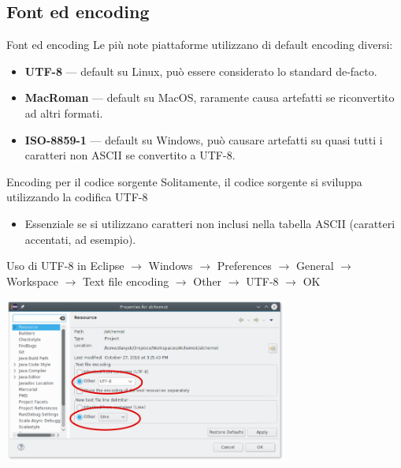 \documentclass[presentation]{beamer}
\begin{document}
\subsection{Font ed encoding}

\begin{frame}{Font ed encoding}
Le più note piattaforme utilizzano di default encoding diversi:

\begin{itemize}
\item \textbf{UTF-8} --- default su Linux, può essere considerato lo standard de-facto.
\item \textbf{MacRoman} --- default su MacOS, raramente causa artefatti se riconvertito ad altri formati.
\item \textbf{ISO-8859-1} --- default su Windows, può causare artefatti su quasi tutti i caratteri non ASCII se convertito a UTF-8.
\end{itemize}

\begin{block}{Encoding per il codice sorgente}
Solitamente, il codice sorgente si sviluppa utilizzando la codifica UTF-8
\begin{itemize}
\item Essenziale se si utilizzano caratteri non inclusi nella tabella ASCII (caratteri accentati, ad esempio).
\end{itemize}
\end{block}
\end{frame}

\begin{frame}{Uso di UTF-8 in Eclipse}
$\rightarrow$ Windows $\rightarrow$ Preferences $\rightarrow$ General $\rightarrow$ Workspace $\rightarrow$ Text file encoding $\rightarrow$ Other $\rightarrow$ UTF-8 $\rightarrow$ OK
\begin{center}
\includegraphics[width=0.7\textwidth]{img/eclipse-encoding}
\end{center}
\end{frame}
\end{document}
